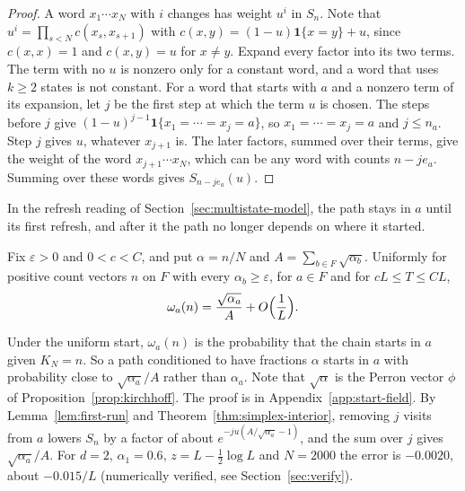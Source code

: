 \begin{proof}
A word $x_1\cdots x_N$ with $i$ changes has weight $u^i$ in $S_n$. Note that
$u^i=\prod_{s<N}c(x_s,x_{s+1})$ with $c(x,y)=(1-u)\mathbf 1\{x=y\}+u$, since
$c(x,x)=1$ and $c(x,y)=u$ for $x\ne y$. Expand every factor into its two terms.
The term with no $u$ is nonzero only for a constant word, and a word that uses
$k\ge2$ states is not constant. For a word that starts with $a$ and a nonzero
term of its expansion, let $j$ be the first step at which the term $u$ is
chosen. The steps before $j$ give $(1-u)^{j-1}\mathbf 1\{x_1=\cdots=x_j=a\}$,
so $x_1=\cdots=x_j=a$ and $j\le n_a$. Step $j$ gives $u$, whatever $x_{j+1}$
is. The later factors, summed over their terms, give the weight of the word
$x_{j+1}\cdots x_N$, which can be any word with counts $n-je_a$. Summing over
these words gives $S_{n-je_a}(u)$.
\end{proof}

In the refresh reading of Section~\ref{sec:multistate-model}, the path stays in
$a$ until its first refresh, and after it the path no longer depends on where it
started.

\begin{proposition}\label{prop:start-weights}
Fix $\varepsilon>0$ and $0<c<C$, and put $\alpha=n/N$ and
$A=\sum_{b\in F}\sqrt{\alpha_b}$. Uniformly for positive count vectors $n$ on
$F$ with every $\alpha_b\ge\varepsilon$, for $a\in F$ and for $cL\le T\le CL$,
\[
 \omega_a(n)=\frac{\sqrt{\alpha_a}}A+O\Bigl(\frac1L\Bigr).
\]
\end{proposition}

Under the uniform start, $\omega_a(n)$ is the probability that the chain starts
in $a$ given $K_N=n$. So a path conditioned to have fractions $\alpha$ starts in
$a$ with probability close to $\sqrt{\alpha_a}/A$ rather than $\alpha_a$. Note that
$\sqrt\alpha$ is the Perron vector $\phi$ of Proposition~\ref{prop:kirchhoff}.
The proof is in Appendix~\ref{app:start-field}. By Lemma~\ref{lem:first-run}
and Theorem~\ref{thm:simplex-interior}, removing $j$ visits from $a$ lowers
$S_n$ by a factor of about $e^{-ju(A/\sqrt{\alpha_a}-1)}$, and the sum over $j$
gives $\sqrt{\alpha_a}/A$. For $d=2$, $\alpha_1=0.6$, $z=L-\frac12\log L$ and
$N=2000$ the error is $-0.0020$, about $-0.015/L$ (numerically verified, see
Section~\ref{sec:verify}).

